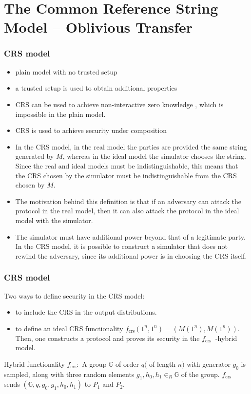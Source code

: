 \documentclass{beamer}
\begin{document}
    \section{The Common Reference String Model – Oblivious Transfer}
    \sectionpage

    \begin{frame}
        \frametitle{CRS model}
        \begin{itemize}
            \item plain model with no trusted setup
            \item a trusted setup is used to obtain additional properties
            \item CRS can be used to achieve non-interactive zero knowledge , which is impossible in the plain model. 
            \item CRS is used to achieve security under composition
            \item In the CRS model, in the real model the parties are provided the same string generated by $M$, whereas in the ideal model the simulator chooses the string. Since the real and ideal models must be indistinguishable, this means that the CRS chosen by the simulator must be indistinguishable from the CRS chosen by $M$. 
            \item The motivation behind this definition is that if an adversary can attack the protocol in the real model, then it can also attack the protocol in the ideal model with the simulator. 
            \item The simulator must have additional power beyond that of a legitimate party. In the CRS model, it is possible to construct a simulator that does not rewind the adversary, since its additional power is in choosing the CRS itself.
        \end{itemize}
    
        
    
    \end{frame}

    \begin{frame}
        \frametitle{CRS model}
        Two ways to define security in the CRS model:
        \begin{itemize}
            \item to include the CRS in the output distributions.
            \item to define an ideal CRS functionality $f_{\mathrm{crs}}\left(1^{n}, 1^{n}\right)=\left(M\left(1^{n}\right), M\left(1^{n}\right)\right) .$ Then, one constructs a protocol and proves its security in the $f_{\text {crs }}$ -hybrid model. 
        \end{itemize}
    
        Hybrid functionality $f_{\mathrm{crs}}:$ A group $\mathbb{G}$ of order $q($ of length $n)$ with generator $g_{0}$ is sampled, along with three random elements $g_{1}, h_{0}, h_{1} \in_{R} \mathbb{G}$ of the group. $f_{\mathrm{crs}}$ sends $\left(\mathbb{G}, q, g_{0}, g_{1}, h_{0}, h_{1}\right)$ to $P_{1}$ and $P_{2} .$
    
    \end{frame}
\end{document}
